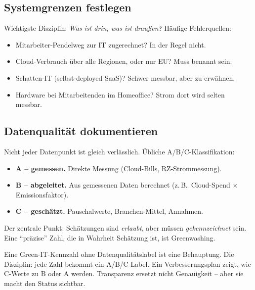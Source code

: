 \documentclass[11pt,a4paper,oneside]{article}
\newcommand{\fachbegriff}[1]{\textbf{#1}}
\begin{document}
\subsection{Systemgrenzen festlegen}

Wichtigste Disziplin: \emph{Was ist drin, was ist draußen?} Häufige Fehlerquellen:

\begin{itemize}
  \item Mitarbeiter-Pendelweg zur IT zugerechnet? In der Regel nicht.
  \item Cloud-Verbrauch über alle Regionen, oder nur EU? Muss benannt sein.
  \item Schatten-IT (selbst-deployed SaaS)? Schwer messbar, aber zu erwähnen.
  \item Hardware bei Mitarbeitenden im Homeoffice? Strom dort wird selten messbar.
\end{itemize}

\subsection{Datenqualität dokumentieren}

Nicht jeder Datenpunkt ist gleich verlässlich. Übliche A/B/C-Klassifikation:

\begin{itemize}
  \item \fachbegriff{A -- gemessen.} Direkte Messung (Cloud-Bills, RZ-Strommessung).
  \item \fachbegriff{B -- abgeleitet.} Aus gemessenen Daten berechnet (z.\,B.\ Cloud-Spend $\times$ Emissionsfaktor).
  \item \fachbegriff{C -- geschätzt.} Pauschalwerte, Branchen-Mittel, Annahmen.
\end{itemize}

Der zentrale Punkt: Schätzungen sind \emph{erlaubt}, aber müssen \emph{gekennzeichnet} sein. Eine ``präzise'' Zahl, die in Wahrheit Schätzung ist, ist Greenwashing.

\begin{merkbox}
Eine Green-IT-Kennzahl ohne Datenqualitätslabel ist eine Behauptung. Die Disziplin: jede Zahl bekommt ein A/B/C-Label. Ein Verbesserungsplan zeigt, wie C-Werte zu B oder A werden. Transparenz ersetzt nicht Genauigkeit -- aber sie macht den Status sichtbar.
\end{merkbox}

\end{document}
